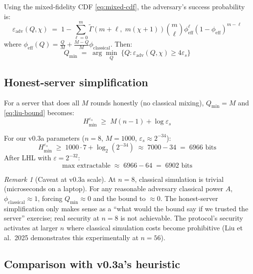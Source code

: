 \documentclass[11pt,a4paper]{article}
\theoremstyle{plain}
\theoremstyle{definition}
\theoremstyle{remark}
\newtheorem*{remark}{Remark}
\newcommand{\Hsmin}[1][\varepsilon_s]{H^{#1}_{\min}}
\begin{document}
Using the mixed-fidelity CDF \eqref{eq:mixed-cdf}, the adversary's success probability is:
\begin{equation}
\varepsilon_{\mathrm{adv}}(Q, \chi) \;=\; 1 - \sum_{\ell=0}^{m} \tilde{\Gamma}\!\left(m+\ell,\; m(\chi+1)\right) \binom{m}{\ell} \phi_{\mathrm{eff}}^{\ell} (1 - \phi_{\mathrm{eff}})^{m-\ell}
\end{equation}
where $\phi_{\mathrm{eff}}(Q) = \tfrac{Q}{M} + \tfrac{M-Q}{M} \phi_{\mathrm{classical}}$. Then:
\begin{equation}
Q_{\min} \;=\; \arg\min_Q \;\{Q : \varepsilon_{\mathrm{adv}}(Q, \chi) \geq 4\varepsilon_s\}
\end{equation}

\subsection{Honest-server simplification}
\label{sec:honest-server}

For a server that does all $M$ rounds honestly (no classical mixing), $Q_{\min} = M$ and \eqref{eq:liu-bound} becomes:
\begin{equation}
\Hsmin \;\geq\; M(n-1) + \log \varepsilon_s
\end{equation}

For our v0.3a parameters ($n=8$, $M=1000$, $\varepsilon_s \approx 2^{-34}$):
\begin{equation}
\Hsmin \;\geq\; 1000 \cdot 7 + \log_2(2^{-34}) \;\approx\; 7000 - 34 \;=\; 6966 \text{ bits}
\end{equation}
After LHL with $\varepsilon = 2^{-32}$:
\begin{equation}
\text{max extractable} \;\approx\; 6966 - 64 \;=\; 6902 \text{ bits}
\end{equation}

\begin{remark}[Caveat at v0.3a scale]
At $n=8$, classical simulation is trivial (microseconds on a laptop). For any reasonable adversary classical power $A$, $\phi_{\mathrm{classical}} \approx 1$, forcing $Q_{\min} \approx 0$ and the bound to $\approx 0$. The honest-server simplification only makes sense as a ``what would the bound say if we trusted the server'' exercise; real security at $n=8$ is not achievable. The protocol's security activates at larger $n$ where classical simulation costs become prohibitive (Liu et al.\ 2025 demonstrates this experimentally at $n=56$).
\end{remark}

\subsection{Comparison with v0.3a's heuristic}
\end{document}
